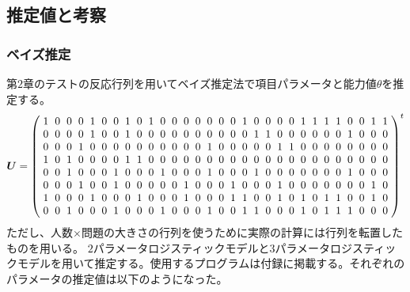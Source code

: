 \documentclass[12pt]{jarticle}
\numberwithin{equation}{subsection}
\begin{document}
\subsection{推定値と考察}
\subsubsection{ベイズ推定}
第$2$章のテストの反応行列を用いてベイズ推定法で項目パラメータと能力値$\theta$を推定する。
\[ \boldsymbol{U} =
\left(
\renewcommand{\arraycolsep}{3pt}
\begin{array}{cccccccccccccccccccccccccccccc}
1 & 0 & 0 & 0 & 1 & 0 & 0 & 1 & 0 & 1 & 0 & 0 & 0 & 0 & 0 & 0 & 0 & 1 & 0 & 0 & 0 & 0 & 1 & 1 & 1 & 1 & 0 & 0 & 1 & 1\\
0 & 0 & 0 & 0 & 1 & 0 & 0 & 1 & 0 & 0 & 0 & 0 & 0 & 0 & 0 & 0 & 0 & 0 & 1 & 1 & 0 & 0 & 0 & 0 & 0 & 0 & 1 & 0 & 0 & 0\\
0 & 0 & 0 & 1 & 0 & 0 & 0 & 0 & 0 & 0 & 0 & 0 & 0 & 0 & 1 & 0 & 0 & 0 & 0 & 0 & 1 & 1 & 0 & 0 & 0 & 0 & 0 & 0 & 0 & 0\\
1 & 0 & 1 & 0 & 0 & 0 & 0 & 1 & 1 & 0 & 0 & 0 & 0 & 0 & 0 & 0 & 0 & 0 & 0 & 0 & 0 & 0 & 0 & 0 & 0 & 0 & 0 & 0 & 0 & 0\\
0 & 0 & 1 & 0 & 0 & 0 & 1 & 0 & 0 & 0 & 1 & 0 & 0 & 0 & 1 & 0 & 0 & 0 & 1 & 0 & 0 & 0 & 0 & 0 & 0 & 0 & 1 & 0 & 0 & 0\\
0 & 0 & 0 & 1 & 0 & 0 & 1 & 0 & 0 & 0 & 0 & 0 & 1 & 0 & 0 & 0 & 1 & 0 & 0 & 0 & 1 & 0 & 0 & 0 & 0 & 0 & 0 & 0 & 1 & 0\\
1 & 0 & 0 & 0 & 1 & 0 & 0 & 0 & 1 & 0 & 0 & 0 & 1 & 0 & 0 & 0 & 1 & 1 & 0 & 0 & 1 & 0 & 1 & 0 & 1 & 1 & 0 & 0 & 1 & 0\\
0 & 0 & 1 & 0 & 0 & 0 & 1 & 0 & 0 & 0 & 1 & 0 & 0 & 0 & 1 & 0 & 0 & 1 & 1 & 0 & 0 & 0 & 1 & 0 & 1 & 1 & 1 & 0 & 0 &0
\end{array}
\right)^t
\]
ただし、人数$\times$問題の大きさの行列を使うために実際の計算には行列を転置したものを用いる。
$2$パラメータロジスティックモデルと$3$パラメータロジスティックモデルを用いて推定する。使用するプログラムは付録に掲載する。それぞれのパラメータの推定値は以下のようになった。
\end{document}
